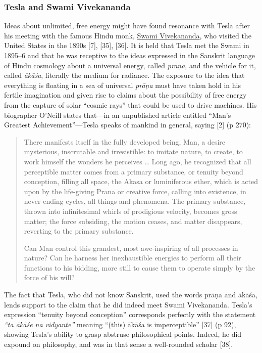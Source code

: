 \documentclass[
  11pt,
  a4paper,
]{article}
\begin{document}
\hypertarget{tesla-and-swami-vivekananda}{%
\subsubsection{Tesla and Swami
Vivekananda}\label{tesla-and-swami-vivekananda}}

Ideas about unlimited, free energy might have found resonance with Tesla
after his meeting with the famous Hindu monk,
\href{https://en.wikipedia.org/wiki/Swami_Vivekananda}{Swami
Vivekananda}, who visited the United States in the 1890s {[}7{]},
{[}35{]}, {[}36{]}. It is held that Tesla met the Swami in 1895--6 and
that he was receptive to the ideas expressed in the Sanskrit language of
Hindu cosmology about a universal energy, called \emph{prāṇa}, and the
vehicle for it, called \emph{ākāśa}, literally the medium for radiance.
The exposure to the idea that everything is floating in a sea of
universal \emph{prāṇa} must have taken hold in his fertile imagination
and given rise to claims about the possibility of free energy from the
capture of solar ``cosmic rays'' that could be used to drive machines.
His biographer O'Neill states that---in an unpublished article entitled
``Man's Greatest Achievement''---Tesla speaks of mankind in general,
saying {[}2{]} (p 270):

\begin{quote}
There manifests itself in the fully developed being, Man, a desire
mysterious, inscrutable and irresistible: to imitate nature, to create,
to work himself the wonders he perceives \ldots{} Long ago, he
recognized that all perceptible matter comes from a primary substance,
or tenuity beyond conception, filling all space, the Akasa or
luminiferous ether, which is acted upon by the life-giving Prana or
creative force, calling into existence, in never ending cycles, all
things and phenomena. The primary substance, thrown into infinitesimal
whirls of prodigious velocity, becomes gross matter; the force
subsiding, the motion ceases, and matter disappears, reverting to the
primary substance.

Can Man control this grandest, most awe-inspiring of all processes in
nature? Can he harness her inexhaustible energies to perform all their
functions to his bidding, more still to cause them to operate simply by
the force of his will?
\end{quote}

The fact that Tesla, who did not know Sanskrit, used the words prāṇa and
ākāśa, lends support to the claim that he did indeed meet Swami
Vivekananda. Tesla's expression ``tenuity beyond conception''
corresponds perfectly with the statement \emph{``ta ākāśe na vidyante''}
meaning ``(this) ākāśa is imperceptible'' {[}37{]} (p 92), showing
Tesla's ability to grasp abstruse philosophical points. Indeed, he did
expound on philosophy, and was in that sense a well-rounded scholar
{[}38{]}.
\end{document}
